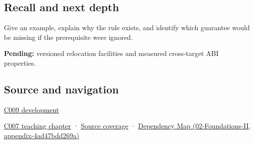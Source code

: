 \subsection{Recall and next depth}\label{appendix-958870a64c53-recall-and-next-depth}

Give an example, explain why the rule exists, and identify which guarantee would be missing if the prerequisite were ignored.

\textbf{Pending:} versioned relocation facilities and measured cross-target ABI properties.

\subsection{Source and navigation}\label{appendix-958870a64c53-source-and-navigation}

\hyperref[appendix-fd090d982a15-m009---parts-127-147]{C009 development}

\hyperref[01-foundations-i-ch003-bringing-the-object-model-back-to-bytes]{C007 teaching chapter} · \hyperref[appendix-fd090d982a15-m007---parts-101-112]{Source coverage} · \href{../02-Foundations-II/main.pdf\#nameddest=appendix-4ad47bdd269a}{Dependency Map (02-Foundations-II, appendix-4ad47bdd269a)}
